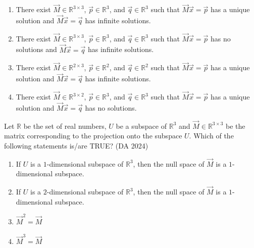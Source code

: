 \begin{enumerate}
\item There exist $\vec{M} \in \mathbb{R}^{3\times3}$, $\vec{p} \in \mathbb{R}^3$, and $\vec{q} \in \mathbb{R}^3$ such that $\vec{M}\vec{x}=\vec{p}$ has a unique solution and $\vec{M}\vec{x}=\vec{q}$ has infinite solutions.
\item There exist $\vec{M} \in \mathbb{R}^{3\times3}$, $\vec{p} \in \mathbb{R}^3$, and $\vec{q} \in \mathbb{R}^3$ such that $\vec{M}\vec{x}=\vec{p}$ has no solutions and $\vec{M}\vec{x}=\vec{q}$ has infinite solutions.
\item There exist $\vec{M} \in \mathbb{R}^{2\times3}$, $\vec{p} \in \mathbb{R}^2$, and $\vec{q} \in \mathbb{R}^2$ such that $\vec{M}\vec{x}=\vec{p}$ has a unique solution and $\vec{M}\vec{x}=\vec{q}$ has infinite solutions.
\item There exist $\vec{M} \in \mathbb{R}^{3\times2}$, $\vec{p} \in \mathbb{R}^3$, and $\vec{q} \in \mathbb{R}^3$ such that $\vec{M}\vec{x}=\vec{p}$ has a unique solution and $\vec{M}\vec{x}=\vec{q}$ has no solutions.
\end{enumerate} 

\item Let $\mathbb{R}$ be the set of real numbers, $U$ be a subspace of $\mathbb{R}^3$ and $\vec{M} \in \mathbb{R}^{3\times 3}$ be the matrix corresponding to the projection onto the subspace $U$. Which of the following statements is/are TRUE?
	\hfill (DA 2024)
\begin{enumerate}
\item If $U$ is a $1$-dimensional subspace of $\mathbb{R}^3$, then the null space of $\vec{M}$ is a $1$-dimensional subspace.
\item If $U$ is a $2$-dimensional subspace of $\mathbb{R}^3$, then the null space of $\vec{M}$ is a $1$-dimensional subspace.
\item $\vec{M}^2 = \vec{M}$
\item $\vec{M}^3 = \vec{M}$
\end{enumerate} 

